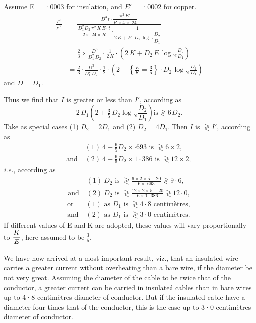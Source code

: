 \documentclass[12pt,oneside]{book}[2021/10/04]
\newcommand{\ie}{\textit{i.e.}}
\newcommand{\xp}{\rule[-2.2ex]{0pt}{3.4ex}}
\begin{document}
Assume E = ·0003 for insulation, and \(E'\) = ·0002 for copper.
\begin{align*}
\frac{I^2}{I'^2} & = \frac{D^3 \, t \cdot \dfrac {\pi^2 \, E'}{R \times 4 \times ·24}}{\dfrac{D^2_{1} \, D_{2} \, \pi^2 \, K \, E \cdot t}{2 \times ·24 \times R} \cdot \dfrac{1}{2 \, K + E \cdot D_{2} \, \log._{e} \dfrac{D_{2}}{D_{1}}}}
\\&= \tfrac{2}{3} \times  \frac{D^3}{D^2_{1} \, D_{2}} \cdot \frac{1}{2 \, K} \cdot \left(2 \, K + D_{2} \, E \, \log._{e} \frac{D_{2}} {D_{1}}\right)
\\&= \tfrac{2}{3} \cdot \frac{D^3}{D^2_{1} \, D_{2}} \cdot \tfrac {1}{2} \cdot \left(2 + \left\{\frac{E}{K} = \tfrac{3}{5}\right\} \cdot D_{2} \, \log._{e} \frac{D_{2}}{D_{1}}\right)
\end{align*}
and \(D = D_{1}\).

Thus we find that \(I\) is greater or less than \(I'\), according as
\[
2 \, D_{1} \left(2 + \tfrac{3}{5} \, D_{2} \log._{e} \frac{D_{2}}{D_{1}}\right) \text{is} \gtrless 6 \, D_{2}.
\]
Take as special cases (1) \(D_{2} = 2 D_{1}\) and (2) \(D_{2} = 4 D_{1}\).
Then \(I\) is \(\gtrless I'\), according as
\begin{align*}
   &(1)~4 + \tfrac{6}{5} D_{2} \times ·693 \text{ is } \gtrless 6 \times 2, \\
\text{and } &(2)~4 + \tfrac{6}{5} D_{2} \times 1·386 \text{ is } \gtrless 12 \times 2,
\end{align*}
\ie, according as
\begin{align*}
&(1)~D_{2} \text{ is } \gtrless \frac{6 \times 2 \times 5 - 20}{6 \times ·693} \gtrless 9·6, \\
\text{and } &(2)~D_{2} \text{ is } \gtrless \frac{12 \times 2 \times 5 - 20}{6 \times 1·386} \gtrless 12·0,
\end{align*}
\begin{align*}
\text{or } &(1) \text{ as } D_{1} \text{ is } \gtrless 4·8 \text{ centimètres},\\
\text{and } &(2) \text{ as } D_{1} \text{ is } \gtrless 3·0 \text{ centimètres.}
\end{align*}
If different values of E and K are adopted, these values will
vary proportionally to \(\xp\dfrac{K}{E}\), here assumed to be \(\tfrac{3}{5}\).

We have now arrived at a most important result, viz., that an
insulated wire carries a greater current without overheating than
a bare wire, if the diameter be not very great. Assuming the
diameter of the cable to be twice that of the conductor, a greater
current can be carried in insulated cables than in bare wires up
to 4·8 centimètres diameter of conductor. But if the insulated
cable have a diameter four times that of the conductor, this is the
case up to 3·0 centimètres diameter of conductor.
\end{document}
